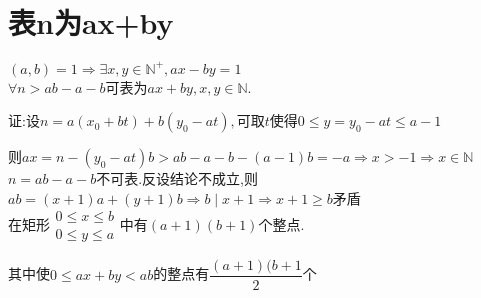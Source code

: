 \section{表n为ax+by}
$(a,b)=1\Rightarrow \exists x,y\in \mathbb{N}^+,ax-by=1$
\\

$ \forall n>ab-a-b$可表为$ ax+by,x,y\in \mathbb{N}$.

证:设$ n=a(x_0+bt)+b(y_0-at),$可取$ t$使得$ 0 \le y =y_0-at\le a-1$

则$ ax=n-(y_0-at)b>ab-a-b-(a-1)b=-a\Rightarrow x>-1\Rightarrow x\in \mathbb{N}$
\\

$ n=ab-a-b$不可表.反设结论不成立,则
$ ab=(x+1)a+(y+1)b\Rightarrow b\mid x+1\Rightarrow x+1\ge b$矛盾
\\

在矩形$\begin{matrix} 0\le x\le b\\ 0\le y\le a \end{matrix} $中有$ (a+1)(b+1)$个整点.

其中使$ 0\le ax+by<ab$的整点有$ \dfrac{(a+1)(b+1}{2}$个
